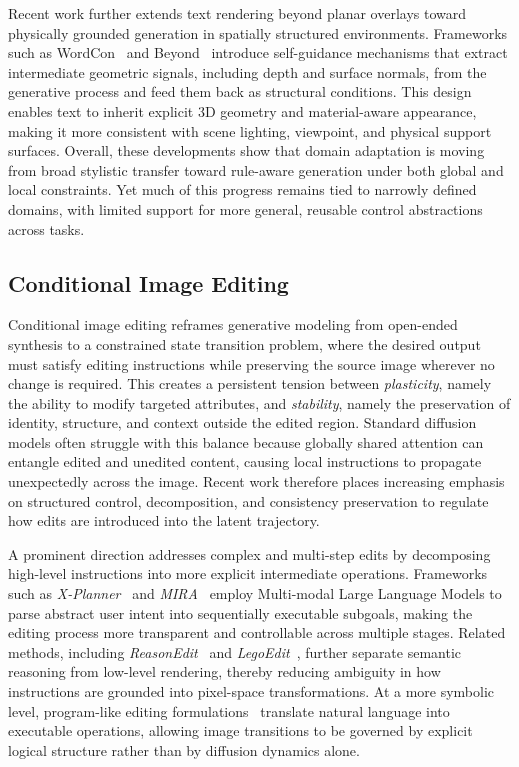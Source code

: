\documentclass{llmxive}
\begin{document}
Recent work further extends text rendering beyond planar overlays toward physically grounded generation in spatially structured environments. Frameworks such as WordCon~\citep{Shi2025WordConWT} and Beyond~\citep{Luo2025BeyondFT} introduce self-guidance mechanisms that extract intermediate geometric signals, including depth and surface normals, from the generative process and feed them back as structural conditions. This design enables text to inherit explicit 3D geometry and material-aware appearance, making it more consistent with scene lighting, viewpoint, and physical support surfaces. Overall, these developments show that domain adaptation is moving from broad stylistic transfer toward rule-aware generation under both global and local constraints. Yet much of this progress remains tied to narrowly defined domains, with limited support for more general, reusable control abstractions across tasks.




\subsection{Conditional Image Editing}
\label{subsec:conditional_editing}

Conditional image editing reframes generative modeling from open-ended synthesis to a constrained state transition problem, where the desired output must satisfy editing instructions while preserving the source image wherever no change is required. This creates a persistent tension between \textit{plasticity}, namely the ability to modify targeted attributes, and \textit{stability}, namely the preservation of identity, structure, and context outside the edited region. Standard diffusion models often struggle with this balance because globally shared attention can entangle edited and unedited content, causing local instructions to propagate unexpectedly across the image. Recent work therefore places increasing emphasis on structured control, decomposition, and consistency preservation to regulate how edits are introduced into the latent trajectory.

A prominent direction addresses complex and multi-step edits by decomposing high-level instructions into more explicit intermediate operations. Frameworks such as \textit{X-Planner}~\citep{Yeh2025BeyondSE} and \textit{MIRA}~\citep{Zeng2025MIRAMI} employ Multi-modal Large Language Models to parse abstract user intent into sequentially executable subgoals, making the editing process more transparent and controllable across multiple stages. Related methods, including \textit{ReasonEdit}~\citep{Yin2025ReasonEditTR} and \textit{LegoEdit}~\citep{Jia2025LegoEditAG}, further separate semantic reasoning from low-level rendering, thereby reducing ambiguity in how instructions are grounded into pixel-space transformations. At a more symbolic level, program-like editing formulations~\citep{Hu2025ImageEA} translate natural language into executable operations, allowing image transitions to be governed by explicit logical structure rather than by diffusion dynamics alone.
\end{document}
